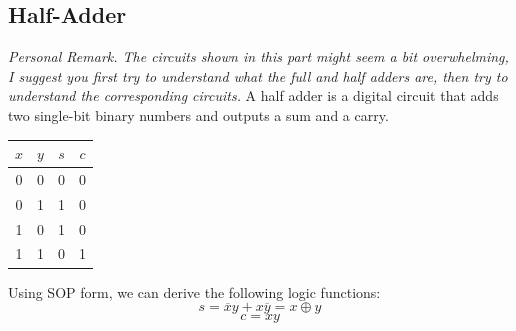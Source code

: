 \documentclass[12pt,openany, tikz,border=10pt]{book}
\newcommand*\xor{\oplus}
\begin{document}
\newpage
\subsection{Half-Adder}
\textit{Personal Remark. The circuits shown in this part might seem a bit overwhelming, I suggest you first try to understand what the full and half adders are, then try to understand the corresponding circuits.} 
\newline
\vspace{10px}
A half adder is a digital circuit that adds two single-bit binary numbers and outputs a sum and a carry. 


\begin{table}[h!]
    \centering
    \begin{tabular}{cccc}
      \hline
      $x$ & $y$ & $s$ & $c$ \\
      \hline
      0 & 0 & 0 & 0 \\
      0 & 1 & 1 & 0 \\
      1 & 0 & 1 & 0 \\
      1 & 1 & 0 & 1 \\
      \hline
    \end{tabular}
  \end{table}

  Using SOP form, we can derive the following logic functions:
  $$ s = \overline{x}y + x\overline{y} = x \xor y$$
  $$ c = xy$$
\end{document}
